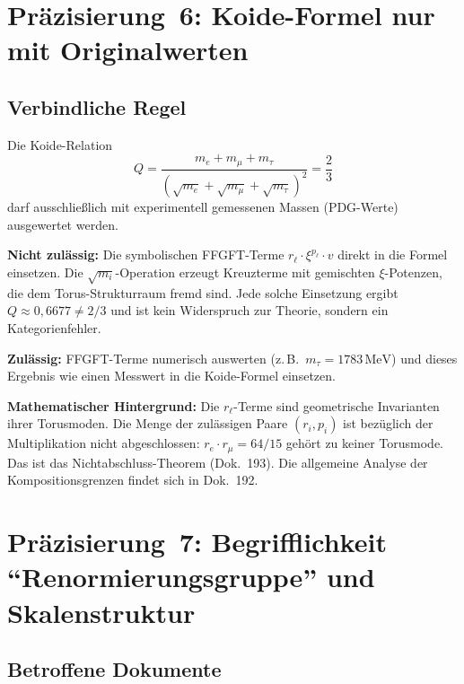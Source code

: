 \section{Präzisierung~6: Koide-Formel nur mit Originalwerten}

\subsection*{Verbindliche Regel}

Die Koide-Relation
\begin{equation}
  Q = \frac{m_e + m_\mu + m_\tau}{(\sqrt{m_e}+\sqrt{m_\mu}+\sqrt{m_\tau})^2} = \frac{2}{3}
  \tag{190.11}
\end{equation}
darf ausschließlich mit experimentell gemessenen Massen (PDG-Werte) ausgewertet werden.

\textbf{Nicht zulässig:} Die symbolischen FFGFT-Terme $r_\ell \cdot \xi^{p_\ell} \cdot v$
direkt in die Formel einsetzen. Die $\sqrt{m_i}$-Operation erzeugt Kreuzterme
mit gemischten $\xi$-Potenzen, die dem Torus-Strukturraum fremd sind.
Jede solche Einsetzung ergibt $Q \approx 0{,}6677 \neq 2/3$ und ist
kein Widerspruch zur Theorie, sondern ein Kategorienfehler.

\textbf{Zulässig:} FFGFT-Terme numerisch auswerten
(z.\,B.\ $m_\tau = 1783\,\text{MeV}$) und dieses Ergebnis
wie einen Messwert in die Koide-Formel einsetzen.

\textbf{Mathematischer Hintergrund:} Die $r_\ell$-Terme sind
geometrische Invarianten ihrer Torusmoden. Die Menge der zulässigen
Paare $(r_i, p_i)$ ist bezüglich der Multiplikation nicht abgeschlossen:
$r_e \cdot r_\mu = 64/15$ gehört zu keiner Torusmode.
Das ist das Nichtabschluss-Theorem (Dok.~193).
Die allgemeine Analyse der Kompositionsgrenzen findet sich in Dok.~192.

\section{\texorpdfstring{Präzisierung~7: Begrifflichkeit \enquote{Renormierungsgruppe} und Skalenstruktur}{Praezisierung 7: Begrifflichkeit Renormierungsgruppe und Skalenstruktur}}

\subsection*{Betroffene Dokumente}


